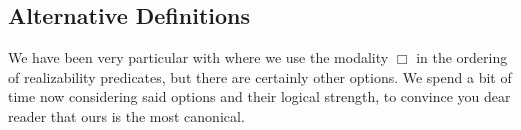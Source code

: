\documentclass[11pt]{article}
\begin{document}
\subsection{Alternative Definitions}

We have been very particular with where we use the modality \(\Box\) in the
ordering of realizability predicates, but there are certainly other options.
%
We spend a bit of time now considering said options and their logical strength,
to convince you dear reader that ours is the most canonical.

\end{document}
